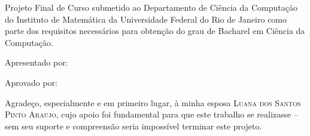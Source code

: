 \documentclass[brazil,pagestart=firstchapter]{abnt}
\begin{document}


\capa

\folhaderosto


\begin{folhadeaprovacao}

\setlength{\ABNTsignthickness}{0.4pt}
\setlength{\ABNTsignskip}{2cm}
\hspace*{1cm}

\centerline{\textbf{\large \ABNTtitulodata}}

\bigskip
\bigskip

\centerline{\textbf{\ABNTautordata}}

\bigskip
\bigskip

Projeto Final de Curso submetido ao Departamento de Ciência da Computação
do Instituto de Matemática da Universidade Federal do Rio de Janeiro como
parte dos requisitos necessários para obtenção do grau de Bacharel em
Ciência da Computação.

Apresentado por:

\assinatura{\ABNTautordata}

Aprovado por:


\bigskip
\bigskip
\bigskip

\begin{center}
\ABNTlocaldata

\ABNTdatadata
\end{center}

\end{folhadeaprovacao}





Agradeço, especialmente e em primeiro lugar, à minha esposa \textsc{Luana dos
Santos Pinto Araujo}, cujo apoio foi fundamental para que este trabalho se
realizasse -- sem seu suporte e compreensão seria impossível terminar este 
projeto.
\end{document}
